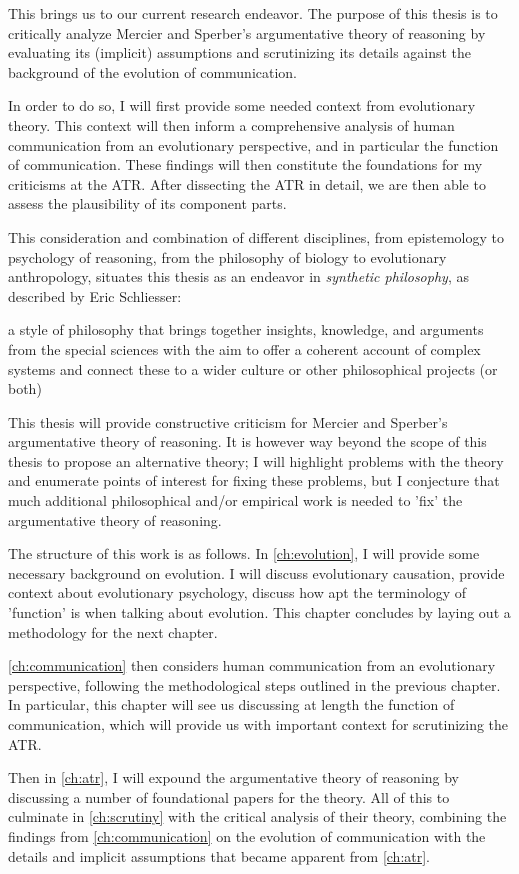 
This brings us to our current research endeavor.
The purpose of this thesis is to critically analyze Mercier and Sperber's argumentative theory of reasoning by evaluating its (implicit) assumptions and scrutinizing its details against the background of the evolution of communication.

In order to do so, I will first provide some needed context from evolutionary theory. This context will then inform a comprehensive analysis of human communication from an evolutionary perspective, and in particular the function of communication. These findings will then constitute the foundations for my criticisms at the ATR.
After dissecting the ATR in detail, we are then able to assess the plausibility of its component parts.

This consideration and combination of different disciplines, from epistemology to psychology of reasoning, from the philosophy of biology to evolutionary anthropology,
situates this thesis as an endeavor in \emph{synthetic philosophy}, as described by Eric Schliesser:
\begin{quoting}
    a style of philosophy that brings together insights, knowledge, and arguments from the special sciences with the aim to offer a coherent account of complex systems and connect these to a wider culture or other philosophical projects (or both) 
    \hfill \citep[pp.~1--2]{Schliesser19}
\end{quoting}

This thesis will provide constructive criticism for Mercier and Sperber's argumentative theory of reasoning. It is however way beyond the scope of this thesis to propose an alternative theory; I will highlight problems with the theory and enumerate points of interest for fixing these problems, but I conjecture that much additional philosophical and/or empirical work is needed to 'fix' the argumentative theory of reasoning.


The structure of this work is as follows.
In \cref{ch:evolution}, I will provide some necessary background on evolution. I will discuss evolutionary causation, provide context about evolutionary psychology, discuss how apt the terminology of 'function' is when talking about evolution. This chapter concludes by laying out a methodology for the next chapter.

\cref{ch:communication} then considers human communication from an evolutionary perspective, following the methodological steps outlined in the previous chapter. In particular, this chapter will see us discussing at length the function of communication, which will provide us with important context for scrutinizing the ATR.

Then in \cref{ch:atr}, I will expound the argumentative theory of reasoning by discussing a number of foundational papers for the theory.
All of this to culminate in \cref{ch:scrutiny} with the critical analysis of their theory, combining the findings from \cref{ch:communication} on the evolution of communication with the details and implicit assumptions that became apparent from \cref{ch:atr}.
